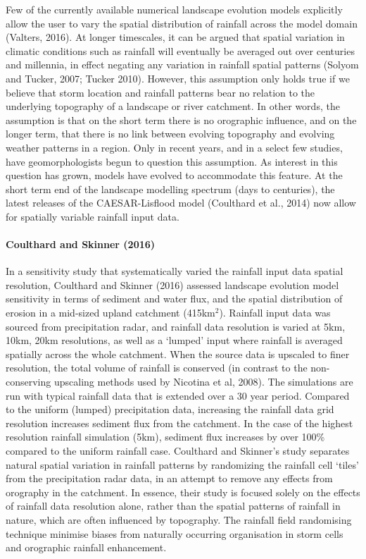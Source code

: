 \documentclass[12pt,oneside,PhD]{muthesis}
\begin{document}
Few of the currently available numerical landscape evolution models explicitly allow the user to vary the spatial distribution of rainfall across the model domain (Valters, 2016). At longer timescales, it can be argued that spatial variation in climatic conditions such as rainfall will eventually be averaged out over centuries and millennia, in effect negating any variation in rainfall spatial patterns (Solyom and Tucker, 2007; Tucker 2010). However, this assumption only holds true if we believe that storm location and rainfall patterns bear no relation to the underlying topography of a landscape or river catchment. In other words, the assumption is that on the short term there is no orographic influence, and on the longer term, that there is no link between evolving topography and evolving weather patterns in a region. Only in recent years, and in a select few studies, have geomorphologists begun to question this assumption. As interest in this question has grown, models have evolved to accommodate this feature. At the short term end of the landscape modelling spectrum (days to centuries), the latest releases of the CAESAR-Lisflood model (Coulthard et al., 2014) now allow for spatially variable rainfall input data. 

\paragraph{Coulthard and Skinner (2016)}

In a sensitivity study that systematically varied the rainfall input data spatial resolution, Coulthard and Skinner (2016) assessed landscape evolution model sensitivity in terms of sediment and water flux, and the spatial distribution of erosion in a mid-sized upland catchment (415km\(^2\)). Rainfall input data was sourced from precipitation radar, and rainfall data resolution is varied at 5km, 10km, 20km resolutions, as well as a `lumped' input where rainfall is averaged spatially across the whole catchment. When the source data is upscaled to finer resolution, the total volume of rainfall is conserved (in contrast to the non-conserving upscaling methods used by Nicotina et al, 2008). The simulations are run with typical rainfall data that is extended over a 30 year period. Compared to the uniform (lumped) precipitation data, increasing the rainfall data grid resolution increases sediment flux from the catchment. In the case of the highest resolution rainfall simulation (5km), sediment flux increases by over 100\% compared to the uniform rainfall case. Coulthard and Skinner's study separates natural spatial variation in rainfall patterns by randomizing the rainfall cell `tiles' from the precipitation radar data, in an attempt to remove any effects from orography in the catchment. In essence, their study is focused solely on the effects of rainfall data resolution alone, rather than the spatial patterns of rainfall in nature, which are often influenced by topography. The rainfall field randomising technique minimise biases from naturally occurring organisation in storm cells and orographic rainfall enhancement. 
\end{document}
